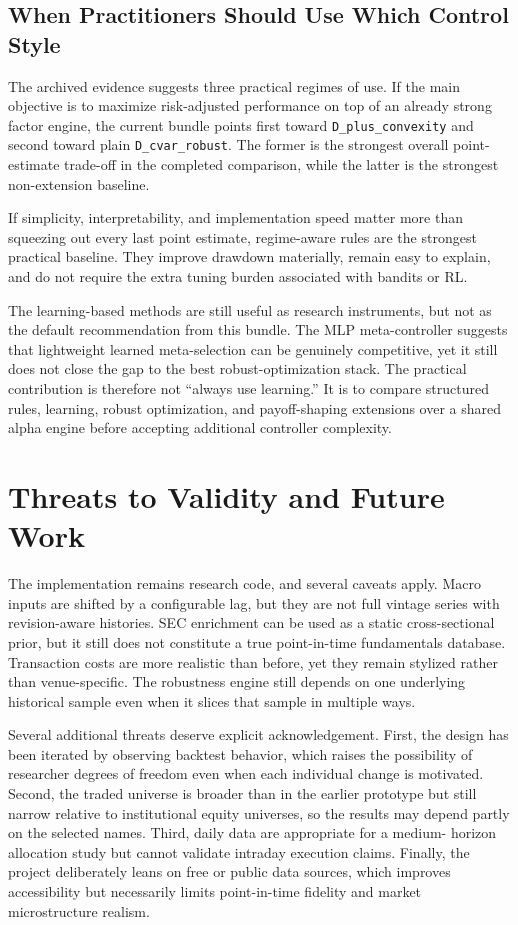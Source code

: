 \documentclass[10pt,twocolumn]{article}
\begin{document}
\subsection{When Practitioners Should Use Which Control Style}

The archived evidence suggests three practical regimes of use. If the main
objective is to maximize risk-adjusted performance on top of an already strong
factor engine, the current bundle points first toward
\texttt{D\_plus\_convexity} and second toward plain \texttt{D\_cvar\_robust}.
The former is the strongest overall point-estimate trade-off in the completed
comparison, while the latter is the strongest non-extension baseline.

If simplicity, interpretability, and implementation speed matter more than
squeezing out every last point estimate, regime-aware rules are the strongest
practical baseline. They improve drawdown materially, remain easy to explain,
and do not require the extra tuning burden associated with bandits or RL.

The learning-based methods are still useful as research instruments, but not as
the default recommendation from this bundle. The MLP meta-controller suggests
that lightweight learned meta-selection can be genuinely competitive, yet it
still does not close the gap to the best robust-optimization stack. The
practical contribution is therefore not ``always use learning.'' It is to
compare structured rules, learning, robust optimization, and payoff-shaping
extensions over a shared alpha engine before accepting additional controller
complexity.

\section{Threats to Validity and Future Work}

The implementation remains research code, and several caveats apply. Macro
inputs are shifted by a configurable lag, but they are not full vintage series
with revision-aware histories. SEC enrichment can be used as a static
cross-sectional prior, but it still does not constitute a true point-in-time
fundamentals database. Transaction costs are more realistic than before, yet
they remain stylized rather than venue-specific. The robustness engine still
depends on one underlying historical sample even when it slices that sample in
multiple ways.

Several additional threats deserve explicit acknowledgement. First, the design
has been iterated by observing backtest behavior, which raises the possibility
of researcher degrees of freedom even when each individual change is motivated.
Second, the traded universe is broader than in the earlier prototype but still
narrow relative to institutional equity universes, so the results may depend
partly on the selected names. Third, daily data are appropriate for a medium-
horizon allocation study but cannot validate intraday execution claims. Finally,
the project deliberately leans on free or public data sources, which improves
accessibility but necessarily limits point-in-time fidelity and market
microstructure realism.
\end{document}
